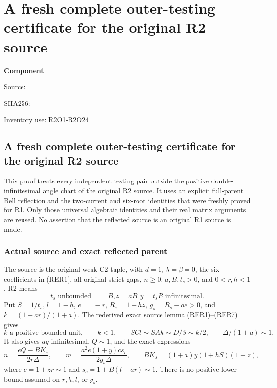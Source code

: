 \chapter{A fresh complete outer-testing certificate for the original R2 source}
\label{component:p8f8780350b13}
\noindent\textbf{Component }\par
{\small\noindent Source: \par}
{\small\noindent SHA256: \par}
{\small\noindent Inventory use: R2O1-R2O24\par}
\medskip
\section{A fresh complete outer-testing certificate for the original R2 source}
\label{p8f8780350b13:sec:r2-rederived-outer-join}

This proof treats every independent testing pair outside the positive
double-infinitesimal angle chart of the original R2 source.  It uses an
explicit full-parent Bell reflection and the two-current and six-root
identities that were freshly proved for R1.  Only those universal algebraic
identities and their real matrix arguments are reused.  No assertion that
the reflected source is an original R1 source is made.

\subsection{Actual source and exact reflected parent}

The source is the original weak-C2 tuple, with $d=1$, $\lambda=\beta=0$,
the six coefficients in (RER1), all original strict gaps, $n\geq0$,
$a,B,t_s>0$, and $0<r,h<1$.  R2 means
\[
t_s\text{ unbounded},\qquad B, z=aB, y=t_sB\text{ infinitesimal}.
\tag{R2O1}
\]
Put $S=1/t_s$, $l=1-h$, $e=1-r$, $R_s=1+hz$,
$g_s=R_s-ae>0$, and $k=(1+ar)/(1+a)$.  The rederived exact source
lemma (RER1)--(RER7) gives
\[
k\text{ a positive bounded unit},\qquad k<1,\qquad
SC l\sim SAh\sim D/S\sim k/2,
\qquad \Delta/(1+a)\sim1.
\tag{R2O2}
\]
It also gives $ay$ infinitesimal, $Q\sim1$, and the exact expressions
\[
n=\frac{eQ-BK_s}{2r\Delta},\qquad
m=\frac{a^2e(1+y)c s_c}{2g_s\Delta},\qquad
BK_s=(1+a)y(1+hS)(1+z),
\tag{R2O3}
\]
where $c=1+zr\sim1$ and $s_c=1+B(l+ar)\sim1$.
There is no positive lower bound assumed on $r,h,l$, or $g_s$.

